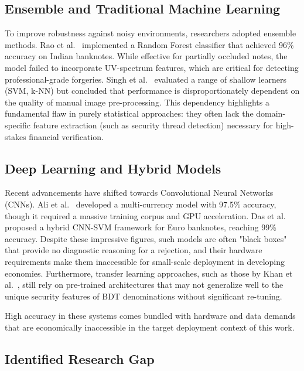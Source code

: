 \documentclass[10pt,a4paper,twocolumn,twoside]{article}
\begin{document}
\subsection{Ensemble and Traditional Machine Learning}

To improve robustness against noisy environments, researchers adopted ensemble methods. Rao et al.~\cite{rao2020} implemented a Random Forest classifier that achieved 96\% accuracy on Indian banknotes. While effective for partially occluded notes, the model failed to incorporate UV-spectrum features, which are critical for detecting professional-grade forgeries. Singh et al.~\cite{singh2020} evaluated a range of shallow learners (SVM, k-NN) but concluded that performance is disproportionately dependent on the quality of manual image pre-processing. This dependency highlights a fundamental flaw in purely statistical approaches: they often lack the domain-specific feature extraction (such as security thread detection) necessary for high-stakes financial verification.

\subsection{Deep Learning and Hybrid Models}

Recent advancements have shifted towards Convolutional Neural Networks (CNNs). Ali et al.~\cite{ali2021} developed a multi-currency model with 97.5\% accuracy, though it required a massive training corpus and GPU acceleration. Das et al.~\cite{das2022} proposed a hybrid CNN-SVM framework for Euro banknotes, reaching 99\% accuracy. Despite these impressive figures, such models are often "black boxes" that provide no diagnostic reasoning for a rejection, and their hardware requirements make them inaccessible for small-scale deployment in developing economies. Furthermore, transfer learning approaches, such as those by Khan et al.~\cite{khan2023}, still rely on pre-trained architectures that may not generalize well to the unique security features of BDT denominations without significant re-tuning.

High accuracy in these systems comes bundled with hardware and data demands that are economically inaccessible in the target deployment context of this work.

\subsection{Identified Research Gap}
\end{document}
